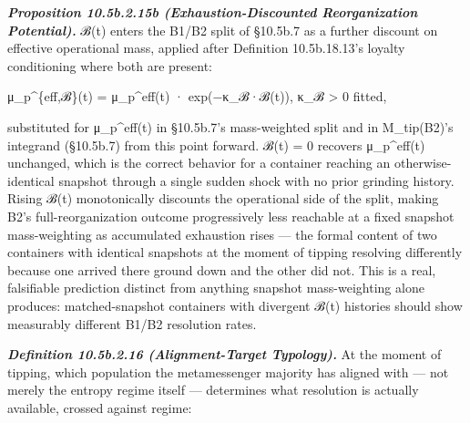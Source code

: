 \documentclass[
]{article}
\begin{document}
\emph{\textbf{Proposition 10.5b.2.15b (Exhaustion-Discounted
Reorganization Potential).}} ℬ(t) enters the B1/B2 split of §10.5b.7 as
a further discount on effective operational mass, applied after
Definition 10.5b.18.13's loyalty conditioning where both are present:

μ\_p\^{}\{eff,ℬ\}(t) = μ\_p\^{}eff(t) · exp(−κ\_ℬ·ℬ(t)), κ\_ℬ
\textgreater{} 0 fitted,

substituted for μ\_p\^{}eff(t) in §10.5b.7's mass-weighted split and in
M\_tip(B2)'s integrand (§10.5b.7) from this point forward. ℬ(t) = 0
recovers μ\_p\^{}eff(t) unchanged, which is the correct behavior for a
container reaching an otherwise-identical snapshot through a single
sudden shock with no prior grinding history. Rising ℬ(t) monotonically
discounts the operational side of the split, making B2's
full-reorganization outcome progressively less reachable at a fixed
snapshot mass-weighting as accumulated exhaustion rises --- the formal
content of two containers with identical snapshots at the moment of
tipping resolving differently because one arrived there ground down and
the other did not. This is a real, falsifiable prediction distinct from
anything snapshot mass-weighting alone produces: matched-snapshot
containers with divergent ℬ(t) histories should show measurably
different B1/B2 resolution rates.

\emph{\textbf{Definition 10.5b.2.16 (Alignment-Target Typology).}} At
the moment of tipping, which population the metamessenger majority has
aligned with --- not merely the entropy regime itself --- determines
what resolution is actually available, crossed against regime:
\end{document}
